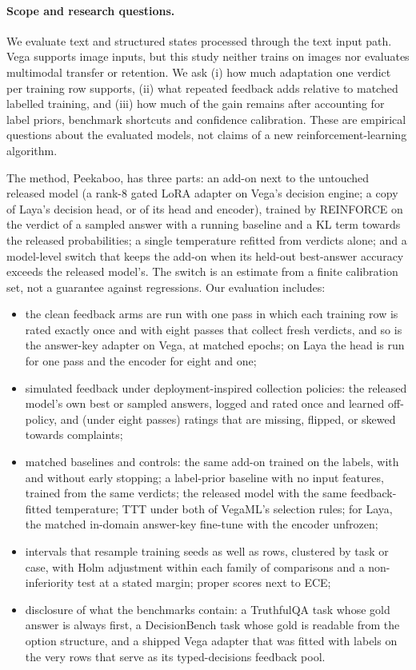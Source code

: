 \documentclass[11pt]{article}
\newcommand{\pk}{Peekaboo}
\begin{document}
\paragraph{Scope and research questions.}
We evaluate text and structured states processed through the text input path. Vega supports image inputs, but this study neither trains on images nor evaluates multimodal transfer or retention. We ask (i) how much adaptation one verdict per training row supports, (ii) what repeated feedback adds relative to matched labelled training, and (iii) how much of the gain remains after accounting for label priors, benchmark shortcuts and confidence calibration. These are empirical questions about the evaluated models, not claims of a new reinforcement-learning algorithm.

The method, \pk{}, has three parts: an add-on next to the untouched released model (a rank-8 gated LoRA adapter on Vega's decision engine; a copy of Laya's decision head, or of its head and encoder), trained by REINFORCE on the verdict of a sampled answer with a running baseline and a KL term towards the released probabilities; a single temperature refitted from verdicts alone; and a model-level switch that keeps the add-on when its held-out best-answer accuracy exceeds the released model's. The switch is an estimate from a finite calibration set, not a guarantee against regressions. Our evaluation includes:
\begin{itemize}
\item the clean feedback arms are run with one pass in which each training row is rated exactly once and with eight passes that collect fresh verdicts, and so is the answer-key adapter on Vega, at matched epochs; on Laya the head is run for one pass and the encoder for eight and one;
\item simulated feedback under deployment-inspired collection policies: the released model's own best or sampled answers, logged and rated once and learned off-policy, and (under eight passes) ratings that are missing, flipped, or skewed towards complaints;
\item matched baselines and controls: the same add-on trained on the labels, with and without early stopping; a label-prior baseline with no input features, trained from the same verdicts; the released model with the same feedback-fitted temperature; TTT under both of VegaML's selection rules; for Laya, the matched in-domain answer-key fine-tune with the encoder unfrozen;
\item intervals that resample training seeds as well as rows, clustered by task or case, with Holm adjustment within each family of comparisons and a non-inferiority test at a stated margin; proper scores next to ECE;
\item disclosure of what the benchmarks contain: a TruthfulQA task whose gold answer is always first, a DecisionBench task whose gold is readable from the option structure, and a shipped Vega adapter that was fitted with labels on the very rows that serve as its typed-decisions feedback pool.
\end{itemize}

\end{document}
